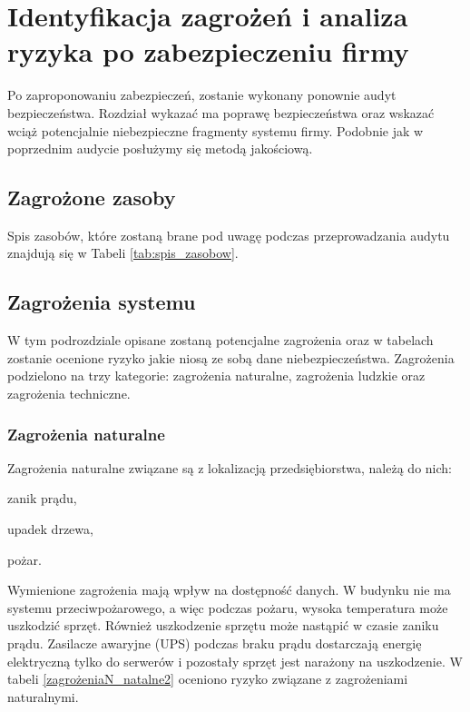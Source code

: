 \newpage
\section{Identyfikacja zagrożeń \newline i analiza ryzyka \newline po zabezpieczeniu firmy}
Po zaproponowaniu zabezpieczeń, zostanie wykonany ponownie audyt bezpieczeństwa. Rozdział wykazać ma poprawę bezpieczeństwa oraz wskazać wciąż potencjalnie niebezpieczne fragmenty systemu firmy.
Podobnie jak w poprzednim audycie posłużymy się metodą jakościową.

\subsection{Zagrożone zasoby}
Spis zasobów, które zostaną brane pod uwagę podczas przeprowadzania audytu znajdują się w Tabeli \ref{tab:spis_zasobow}.

\subsection{Zagrożenia systemu}
W tym podrozdziale opisane zostaną potencjalne zagrożenia oraz w tabelach zostanie ocenione ryzyko jakie niosą ze sobą dane niebezpieczeństwa. Zagrożenia podzielono na trzy kategorie: zagrożenia naturalne, zagrożenia ludzkie oraz zagrożenia techniczne.

\subsubsection{Zagrożenia naturalne} 
Zagrożenia naturalne związane są z lokalizacją przedsiębiorstwa, należą do nich:
\begin{itemize*}
	\item zanik prądu,
	\item upadek drzewa,
	\item pożar.
\end{itemize*}

Wymienione zagrożenia mają wpływ na dostępność danych. W budynku nie ma systemu przeciwpożarowego, a więc podczas pożaru, wysoka temperatura może uszkodzić sprzęt. Również uszkodzenie sprzętu może nastąpić w czasie zaniku prądu. Zasilacze awaryjne (UPS) podczas braku prądu dostarczają energię elektryczną tylko do serwerów i pozostały sprzęt jest narażony na uszkodzenie. W tabeli \ref{zagrożeniaN_natalne2} oceniono ryzyko związane z zagrożeniami naturalnymi.

